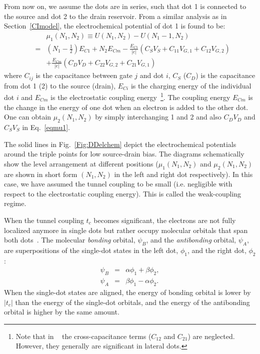 \documentclass[rmp,twocolumn,aps]{revtex4}
\begin{document}
From now on, we assume the dots are in series, such that dot 1 is
connected to the source and dot 2 to the drain reservoir. From a
similar analysis as in Section~\ref{CImodel}, the electrochemical
potential of dot 1 is found to be:
\begin{eqnarray}
&&\mu _{1}(N_{1},N_{2}) \equiv  U(N_{1},N_{2})-U(N_{1}-1,N_{2}) \nonumber \\
&\!\!=&\!\!\!(N_{1}\!\!-\!\!\frac{1}{2})E_{C1}\!\!+\!\!N_{2}E_{Cm}\!\!-\!\! \frac{E_{C1}}{|e|}(C_S V_S\!\!+\!\!C_{11}V_{G,1}\!\!+\!\!C_{12}V_{G,2}) \nonumber \\
&&+\frac{E_{Cm}}{|e|}(C_D V_D+C_{22}V_{G,2}+C_{21}V_{G,1})
\label{eqmu1}
\end{eqnarray}
\noindent where $C_{ij}$ is the capacitance between gate $j$ and
dot $i$, $C_{S}$ ($C_{D}$) is the capacitance from dot 1 (2) to
the source (drain), $E_{Ci}$ is the charging energy of the
individual dot $i$ and $E_{Cm}$ is the electrostatic coupling
energy~\footnote{Note that in ~\textcite{WielRMP2003} the
cross-capacitance terms ($C_{12}$ and $C_{21}$) are neglected.
However, they generally are significant in lateral dots.}. The
coupling energy $E_{Cm}$ is the change in the energy of one dot
when an electron is added to the other dot. One can obtain $\mu
_{2}(N_{1},N_{2})$ by simply interchanging 1 and 2 and also $C_D
V_D$ and $C_S V_S$ in Eq.~\ref{eqmu1}.

The solid lines in Fig.~\ref{Fig:DDelchem} depict the
electrochemical potentials around the triple points for low
source-drain bias. The diagrams schematically show the level
arrangement at different positions ($\mu _{1}(N_{1},N_{2})$ and
$\mu _{2}(N_{1},N_{2})$ are shown in short form $(N_{1},N_{2})$ in
the left and right dot respectively). In this case, we have
assumed the tunnel coupling to be small (i.e. negligible with
respect to the electrostatic coupling energy). This is called the
weak-coupling regime.

When the tunnel coupling $t_c$ becomes significant, the electrons are
not fully localized anymore in single dots but rather occupy
molecular orbitals that span both dots~\cite{WielRMP2003}. The molecular \textit{bonding} orbital, $\psi_B$, and the \textit{antibonding} orbital, $\psi_A$, are superpositions of the single-dot states in the left dot, $\phi_1$, and the right dot, $\phi_2$:
\begin{eqnarray}
	\psi_B &=& \alpha \phi_1 + \beta \phi_2,\\
	\psi_A &=& \beta \phi_1 - \alpha \phi_2.
\end{eqnarray}
When the single-dot states are aligned, the energy of bonding orbital is lower by $\left| t_c \right|$ than the energy of the single-dot orbitals, and the energy of the antibonding orbital is higher by the same amount.
\end{document}
